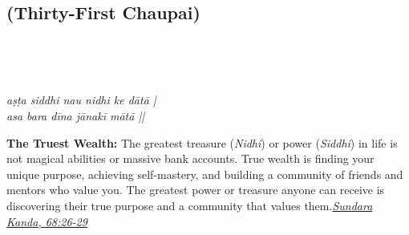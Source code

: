 
\newpage

\subsection*{ (Thirty-First Chaupai)}

\begin{minipage}[t]{0.55\textwidth}
\vspace{0pt}

{\large \linespread{1.5}\selectfont
{}\\
\par}

\vspace{0.5em}

{\large \linespread{1.5}\selectfont
{}\\
\par}

\vspace{0.5em}

{\large \linespread{1.3}\selectfont
\textit{aṣṭa siddhi nau nidhi ke dātā |}\\
\textit{asa bara dīna jānakī mātā ||}
\par}
\end{minipage}%
\hfill
\begin{minipage}[t]{0.42\textwidth}
\vspace{0pt}
\begin{tcolorbox}[anchorbox]
\textbf{The Truest Wealth:} The greatest treasure (\textit{Nidhi}) or power (\textit{Siddhi}) in life is not magical abilities or massive bank accounts. True wealth is finding your unique purpose, achieving self-mastery, and building a community of friends and mentors who value you.
\vspace{0.5em}\newline The greatest power or treasure anyone can receive is discovering their true purpose and a community that values them.\newline\null\hfill\href{https://www.valmiki.iitk.ac.in/sloka?field_kanda_tid=5&language=dv&field_sarga_value=68}{\textit{Sundara Kanda, 68:26-29}}
\end{tcolorbox}
\end{minipage}

